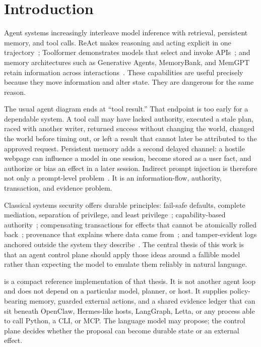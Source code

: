 \section{Introduction}

Agent systems increasingly interleave model inference with retrieval, persistent memory, and tool calls. ReAct makes reasoning and acting explicit in one trajectory~\cite{yao2023react}; Toolformer demonstrates models that select and invoke APIs~\cite{schick2023toolformer}; and memory architectures such as Generative Agents, MemoryBank, and MemGPT retain information across interactions~\cite{park2023generative,zhong2023memorybank,packer2023memgpt}. These capabilities are useful precisely because they move information and alter state. They are dangerous for the same reason.

The usual agent diagram ends at ``tool result.'' That endpoint is too early for a dependable system. A tool call may have lacked authority, executed a stale plan, raced with another writer, returned success without changing the world, changed the world before timing out, or left a result that cannot later be attributed to the approved request. Persistent memory adds a second delayed channel: a hostile webpage can influence a model in one session, become stored as a user fact, and authorize or bias an effect in a later session. Indirect prompt injection is therefore not only a prompt-level problem~\cite{greshake2023indirect,debenedetti2024agentdojo}. It is an information-flow, authority, transaction, and evidence problem.

Classical systems security offers durable principles: fail-safe defaults, complete mediation, separation of privilege, and least privilege~\cite{saltzer1975protection}; capability-based authority~\cite{dennis1966capabilities,miller2003capability}; compensating transactions for effects that cannot be atomically rolled back~\cite{garciamolina1987sagas}; provenance that explains where data came from~\cite{buneman2001provenance}; and tamper-evident logs anchored outside the system they describe~\cite{schneier1998securelogs,haber1991timestamp}. The central thesis of this work is that an agent control plane should apply those ideas around a fallible model rather than expecting the model to emulate them reliably in natural language.

\system{} is a compact reference implementation of that thesis. It is not another agent loop and does not depend on a particular model, planner, or host. It supplies policy-bearing memory, guarded external actions, and a shared evidence ledger that can sit beneath OpenClaw, Hermes-like hosts, LangGraph, Letta, or any process able to call Python, a CLI, or MCP. The language model may propose; the control plane decides whether the proposal can become durable state or an external effect.

